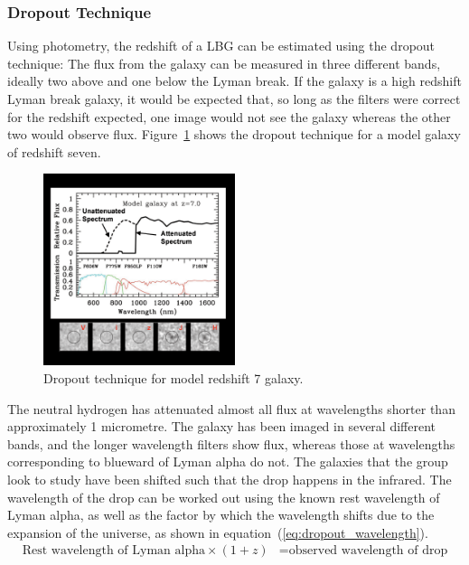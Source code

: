 		\subsubsection{Dropout Technique} %
		\label{ssub:dropout_technique}
			Using photometry, the redshift of a LBG can be estimated using the dropout technique: The flux from the galaxy can be measured in three different bands, ideally two above and one below the Lyman break. If the galaxy is a high redshift Lyman break galaxy, it would be expected that, so long as the filters were correct for the redshift expected, one image would not see the galaxy whereas the other two would observe flux. Figure~\ref{fig:drop_out_at_z7} shows the dropout technique for a model galaxy of redshift seven.
			\begin{figure}[htbp]
				\centering
				\includegraphics[width=0.5\textwidth]{../Images/drop_out_at_z7.png}
				\caption{Dropout technique for model redshift 7 galaxy\cite{first_galaxies_dropout_at_z7}.\label{fig:drop_out_at_z7}}
			\end{figure}

			The neutral hydrogen has attenuated almost all flux at wavelengths shorter than approximately 1 micrometre. The galaxy has been imaged in several different bands, and the longer wavelength filters show flux, whereas those at wavelengths corresponding to blueward of Lyman alpha do not. The galaxies that the group look to study have been shifted such that the drop happens in the infrared. The wavelength of the drop can be worked out using the known rest wavelength of Lyman alpha, as well as the factor by which the wavelength shifts due to the expansion of the universe, as shown in equation~(\ref{eq:dropout_wavelength}).
			\begin{align}
				\text{Rest wavelength of Lyman alpha} \times (1+z) &= \text{observed wavelength of drop}\label{eq:dropout_wavelength}
			\end{align}

